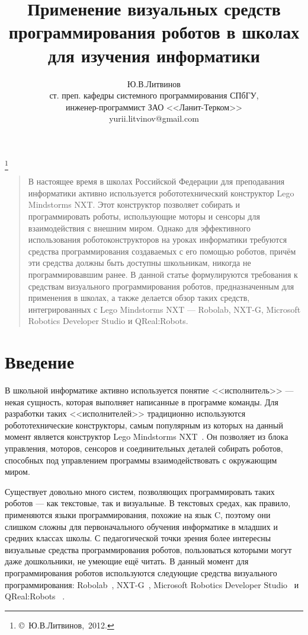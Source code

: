 \documentclass[a4paper]{article}
\title{Применение визуальных средств программирования роботов в школах для изучения информатики}
\author{Ю.В.Литвинов \\ ст. преп. кафедры системного программирования СПбГУ, \\ инженер-программист ЗАО <<Ланит-Терком>> \\ yurii.litvinov@gmail.com}
\date{}
\begin{document}
\maketitle
\thispagestyle{empty}

\renewcommand{\thefootnote}{}
\footnote{\small{\copyright~Ю.В.Литвинов,~2012.}}
\renewcommand{\thefootnote}{\arabic{footnote}}
\setcounter{footnote}{0}

\begin{quote}
\small\noindent
В настоящее время в школах Российской Федерации для преподавания информатики активно используется робототехнический конструктор Lego Mindstorms NXT. Этот конструктор позволяет собирать и программировать роботы, использующие моторы и сенсоры для взаимодействия с внешним миром. Однако для эффективного использования роботоконструкторов на уроках информатики требуются средства программирования создаваемых с его помощью роботов, причём эти средства должны быть доступны школьникам, никогда не программировавшим ранее. В данной статье формулируются требования к средствам визуального программирования роботов, предназначенным для применения в школах, а также делается обзор таких средств, интегрированных с  Lego Mindstorms NXT --- Robolab, NXT-G, Microsoft Robotics Developer Studio и QReal:Robots.
\end{quote}

\section*{Введение}
В школьной информатике активно используется понятие <<исполнитель>> --- некая сущность, которая выполняет написанные в программе команды. Для разработки таких <<исполнителей>> традиционно используются робототехнические конструкторы, самым популярным из которых на данный момент является конструктор Lego Mindstorms NXT~\cite{legoNxt}. Он позволяет из блока управления, моторов, сенсоров и соединительных деталей собирать роботов, способных под управлением программы взаимодействовать с окружающим миром.

Существует довольно много систем, позволяющих программировать таких роботов --- как текстовые, так и визуальные. В текстовых средах, как правило, применяются языки программирования, похожие на язык C, поэтому они слишком сложны для первоначального обучения информатике в младших и средних классах школы. С педагогической точки зрения более интересны визуальные средства программирования роботов, пользоваться которыми могут даже дошкольники, не умеющие ещё читать. В данный момент для программирования роботов используются следующие средства визуального программирования: Robolab~\cite{robolab}, NXT-G~\cite{nxtG}, Microsoft Robotics Developer Studio~\cite{mrds} и QReal:Robots~\cite{robots} . 
\end{document}
